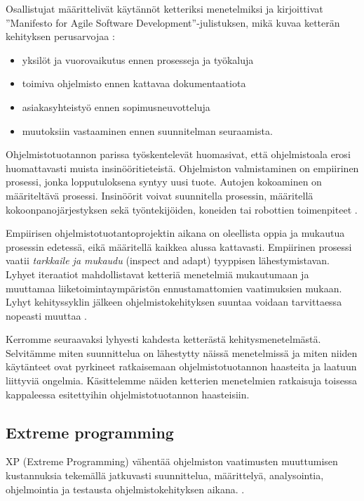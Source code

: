 \documentclass[finnish]{tktltiki2}
\theoremstyle{definition}
\theoremstyle{remark}
\begin{document}
{Osallistujat määrittelivät käytännöt ketteriksi menetelmiksi ja kirjoittivat ''Manifesto for Agile Software Development''-julistuksen, mikä kuvaa ketterän kehityksen perusarvojaa \cite{WIC03}:

\begin{itemize}
\item yksilöt ja vuorovaikutus ennen prosesseja ja työkaluja
\item toimiva ohjelmisto ennen kattavaa dokumentaatiota
\item asiakasyhteistyö ennen sopimusneuvotteluja
\item muutoksiin vastaaminen ennen suunnitelman seuraamista.
\end{itemize}

Ohjelmistotuotannon parissa työskentelevät huomasivat, että ohjelmistoala erosi huomattavasti muista insinööritieteistä. Ohjelmiston valmistaminen on empiirinen prosessi, jonka lopputuloksena syntyy uusi tuote. Autojen kokoaminen on määriteltävä prosessi. Insinöörit voivat suunnitella prosessin, määritellä kokoonpanojärjestyksen sekä työntekijöiden, koneiden tai robottien toimenpiteet \cite{WIC03}.

Empiirisen ohjelmistotuotantoprojektin aikana on oleellista oppia ja mukautua prosessin edetessä, eikä määritellä kaikkea alussa kattavasti. Empiirinen prosessi vaatii \textit{tarkkaile ja mukaudu} (inspect and adapt) tyyppisen lähestymistavan. Lyhyet iteraatiot mahdollistavat ketteriä menetelmiä mukautumaan ja muuttamaa liiketoimintaympäristön ennustamattomien vaatimuksien mukaan. Lyhyt kehityssyklin jälkeen ohjelmistokehityksen suuntaa voidaan tarvittaessa nopeasti muuttaa  \cite{WIC03}.

Kerromme seuraavaksi lyhyesti kahdesta ketterästä kehitysmenetelmästä. Selvitämme miten suunnittelua on lähestytty näissä menetelmissä ja miten niiden käytänteet ovat pyrkineet ratkaisemaan ohjelmistotuotannon haasteita ja laatuun liittyviä ongelmia. Käsittelemme näiden ketterien menetelmien ratkaisuja toisessa kappaleessa esitettyihin ohjelmistotuotannon haasteisiin. 

\subsection{Extreme programming}

XP (Extreme Programming) vähentää ohjelmiston vaatimusten muuttumisen kustannuksia tekemällä jatkuvasti suunnittelua, määrittelyä, analysointia, ohjelmointia ja testausta ohjelmistokehityksen aikana.  \cite{BEC99}.

}
\end{document}
